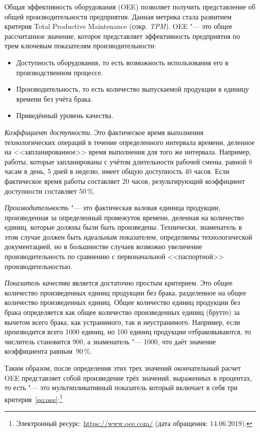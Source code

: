 Общая эффективность оборудования (OEE) позволяет получить представление об общей производительности предприятия. Данная метрика стала развитием критерия Total Productive Maintenance (сокр. \textit{TPM}). OEE "--- это общее рассчитанное значение, которое представляет эффективность предприятия по трем ключевым показателям производительности:

\begin{itemize}
	\item Доступность оборудования, то есть возможность использования его в производственном процессе.
	\item Производительность, то есть количество выпускаемой продукции в единицу времени без учёта брака.
	\item Приведённый уровень качества. 
\end{itemize}

\textit{Коэффициент доступности}. Это фактическое время выполнения технологических операций в течение определенного интервала времени, деленное на <<запланированное>> время выполнения для того же интервала. Например, работы, которые запланированы с учётом длительности рабочей смены, равной 8 часам в день, 5 дней в неделю, имеет общую доступность 40 часов. Если фактическое время работы составляет 20 часов, результирующий коэффициент доступности составляет 50\,\%.

\textit{Производительность} "--- это фактическая валовая единица продукции, произведенная за определенный промежуток времени, деленная на количество единиц, которые должны были быть произведены. Технически, знаменатель в этом случае должен быть идеальным показателем, определяемы технологической документацией, но в большинстве случаев возможно увеличение производительность по сравнению с первоначальной <<паспортной>> производительностью.

\textit{Показатель качества} является достаточно простым критерием. Это общее количество произведенных единиц продукции без брака, разделенное на общее количество произведенных единиц. Общее количество единиц продукции без брака определяется как общее количество произведенных единиц (брутто) за вычетом всего брака, как устранимого, так и неустранимого. Например, если производится всего 1000 единиц, но 100 единиц продукции отбраковываются, то числитель становится 900, а знаменатель "--- 1000, что даёт значение коэффициента равным~90\,\%.

Таким образом, после определения этих трех значений окончательный расчет OEE представляет собой произведение трёх значений, выраженных в процентах, то есть "--- это мультипликативный показатель который включает в себя три критерия~\cref{eq:oee}:\footnote{Электронный ресурс: \url{https://www.oee.com/} (дата обращения: 14.06.2019).}

